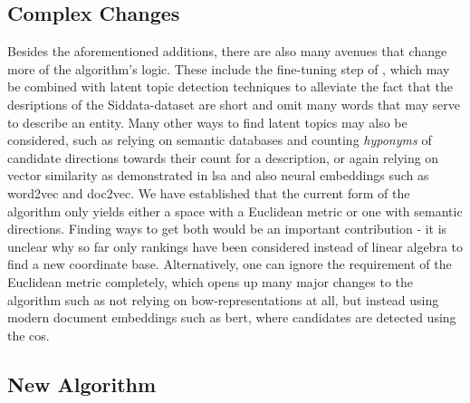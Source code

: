 \subsection*{Complex Changes} Besides the aforementioned additions, there are also many avenues that change more of the algorithm's logic. These include the fine-tuning step of \textcite{Ager2018}, which may be combined with latent topic detection techniques to alleviate the fact that the desriptions of the Siddata-dataset are short and omit many words that may serve to describe an entity. Many other ways to find latent topics may also be considered, such as relying on semantic databases and counting \textit{hyponyms} of candidate directions towards their count for a description, or again relying on vector similarity as demonstrated in \gls{lsa} and also neural embeddings such as \gls{word2vec} and \gls{doc2vec}. We have established that the current form of the algorithm only yields either a space with a Euclidean metric or one with semantic directions. Finding ways to get both would be an important contribution - it is \eg unclear why so far only rankings have been considered instead of linear algebra to find a new coordinate base. Alternatively, one can ignore the requirement of the Euclidean metric completely, which opens up many major changes to the algorithm such as not relying on \gls{bow}-representations at all, but instead using modern document embeddings such as \gls{bert}, where candidates are detected using the \gls{cos}.

\subsection*{New Algorithm}

